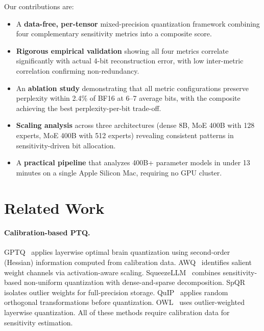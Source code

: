 \documentclass{article}
\begin{document}
Our contributions are:
\begin{itemize}
    \item A \textbf{data-free, per-tensor} mixed-precision quantization framework combining four complementary sensitivity metrics into a composite score.
    \item \textbf{Rigorous empirical validation} showing all four metrics correlate significantly with actual 4-bit reconstruction error, with low inter-metric correlation confirming non-redundancy.
    \item An \textbf{ablation study} demonstrating that all metric configurations preserve perplexity within 2.4\% of BF16 at 6--7 average bits, with the composite achieving the best perplexity-per-bit trade-off.
    \item \textbf{Scaling analysis} across three architectures (dense 8B, MoE 400B with 128 experts, MoE 400B with 512 experts) revealing consistent patterns in sensitivity-driven bit allocation.
    \item A \textbf{practical pipeline} that analyzes 400B+ parameter models in under 13 minutes on a single Apple Silicon Mac, requiring no GPU cluster.
\end{itemize}

\section{Related Work}
\label{sec:related}

\paragraph{Calibration-based PTQ.}
GPTQ~\cite{frantar2023gptq} applies layerwise optimal brain quantization using second-order (Hessian) information computed from calibration data. AWQ~\cite{lin2024awq} identifies salient weight channels via activation-aware scaling. SqueezeLLM~\cite{kim2024squeezellm} combines sensitivity-based non-uniform quantization with dense-and-sparse decomposition. SpQR~\cite{dettmers2024spqr} isolates outlier weights for full-precision storage. QuIP~\cite{chee2024quip} applies random orthogonal transformations before quantization. OWL~\cite{yin2024owl} uses outlier-weighted layerwise quantization. All of these methods require calibration data for sensitivity estimation.
\end{document}
